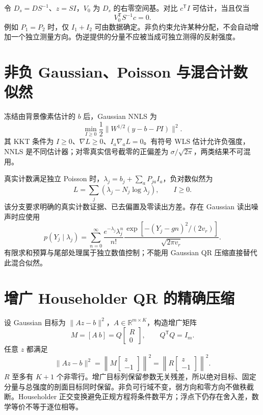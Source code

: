 令 $D_s=DS^{-1}$、$z=SI$，$V_0$ 为 $D_s$ 的右零空间基。对比 $c^{\mathsf T}I$ 可估计，当且仅当
\begin{equation}
V_0^{\mathsf T}S^{-1}c=0.
\end{equation}
例如 $P_1=P_2$ 时，仅 $I_1+I_2$ 可由数据确定。非负约束允许某种分配，不会自动增加一个独立测量方向。伪逆提供的分量不应被当成可独立测得的反射强度。
\section{非负 Gaussian、Poisson 与混合计数似然}
冻结由背景像素估计的 $b$ 后，Gaussian NNLS 为
\begin{equation}
\min_{I\ge0}\frac12\|W^{1/2}(y-b-PI)\|^2.
\end{equation}
其 KKT 条件为 $I\ge0$、$\nabla L\ge0$、$I_a\nabla_aL=0$。有符号 WLS 估计允许负强度，NNLS 是不同估计器；对零真实信号截零的正偏差为 $\sigma/\sqrt{2\pi}$，两类结果不可混用。

真实计数满足独立 Poisson 时，$\lambda_j=b_j+\sum_aP_{ja}I_a$，负对数似然为
\begin{equation}
L=\sum_j(\lambda_j-N_j\log\lambda_j),\qquad I\ge0.
\end{equation}
该分支要求明确的真实计数证据、已去偏置及零读出方差。存在 Gaussian 读出噪声时应使用
\begin{equation}
p(Y_j\mid\lambda_j)=\sum_{n=0}^{\infty}
\frac{e^{-\lambda_j}\lambda_j^n}{n!}
\frac{\exp[-(Y_j-gn)^2/(2v_r)]}{\sqrt{2\pi v_r}}.
\end{equation}
有限求和预算与尾部处理属于独立数值控制；不能用 Gaussian QR 压缩直接替代此混合似然。
\section{增广 Householder QR 的精确压缩}
设 Gaussian 目标为 $\|Az-b\|^2$，$A\in\mathbb R^{m\times K}$，构造增广矩阵
\begin{equation}
M=[A\ b]=Q\begin{bmatrix}R\\0\end{bmatrix},\qquad Q^{\mathsf T}Q=I_m.
\end{equation}
任意 $z$ 都满足
\begin{equation}
\|Az-b\|^2=\left\|M\begin{bmatrix}z\\-1\end{bmatrix}\right\|^2
=\left\|R\begin{bmatrix}z\\-1\end{bmatrix}\right\|^2.
\label{eq:augmentedqr}
\end{equation}
$R$ 至多有 $K+1$ 个非零行。增广目标列保留参数无关残差，所以绝对目标、固定分量与总强度的剖面目标同时保留。非负可行域不变，弱方向和零方向不做秩截断。Householder 正交变换避免正规方程将条件数平方；浮点下仍存在舍入差，数学等价不等于逐位相等。

